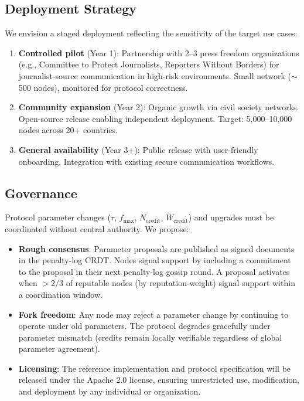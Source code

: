 \documentclass[11pt,a4paper]{article}
\begin{document}
\subsection{Deployment Strategy}

We envision a staged deployment reflecting the sensitivity of the target use cases:

\begin{enumerate}[nosep]
    \item \textbf{Controlled pilot} (Year 1): Partnership with 2--3 press freedom organizations (e.g., Committee to Protect Journalists, Reporters Without Borders) for journalist-source communication in high-risk environments. Small network ($\sim$500 nodes), monitored for protocol correctness.
    \item \textbf{Community expansion} (Year 2): Organic growth via civil society networks. Open-source release enabling independent deployment. Target: 5,000--10,000 nodes across 20+ countries.
    \item \textbf{General availability} (Year 3+): Public release with user-friendly onboarding. Integration with existing secure communication workflows.
\end{enumerate}

\subsection{Governance}

Protocol parameter changes ($\tau$, $f_{\max}$, $N_{\text{credit}}$, $W_{\text{credit}}$) and upgrades must be coordinated without central authority. We propose:

\begin{itemize}[nosep]
    \item \textbf{Rough consensus}: Parameter proposals are published as signed documents in the penalty-log CRDT. Nodes signal support by including a commitment to the proposal in their next penalty-log gossip round. A proposal activates when $> 2/3$ of reputable nodes (by reputation-weight) signal support within a coordination window.
    \item \textbf{Fork freedom}: Any node may reject a parameter change by continuing to operate under old parameters. The protocol degrades gracefully under parameter mismatch (credits remain locally verifiable regardless of global parameter agreement).
    \item \textbf{Licensing}: The reference implementation and protocol specification will be released under the Apache 2.0 license, ensuring unrestricted use, modification, and deployment by any individual or organization.
\end{itemize}
\end{document}
